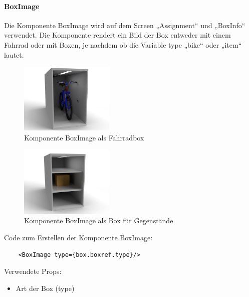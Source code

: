 \paragraph{BoxImage}Die Komponente BoxImage wird auf dem Screen „Assignment“ und „BoxInfo“ verwendet. Die Komponente rendert ein Bild der Box entweder mit einem Fahrrad oder mit Boxen, je nachdem ob die Variable type „bike“ oder „item“ lautet.\\
\begin{figure}[H]
    \centering
    \includegraphics[width=0.4\textwidth]{images/box_bike.png}
    \caption{Komponente BoxImage als Fahrradbox}
    \label{fig:boximagebike}
\end{figure}
\begin{figure}[H]
    \centering
    \includegraphics[width=0.4\textwidth]{images/box_item.png}
    \caption{Komponente BoxImage als Box für Gegenstände}
    \label{fig:boximageitem}
\end{figure}
Code zum Erstellen der Komponente BoxImage:\\
\begin{verbatim}
    <BoxImage type={box.boxref.type}/>
\end{verbatim}
Verwendete Props:
\begin{itemize}
    \item Art der Box (type)
\end{itemize}
